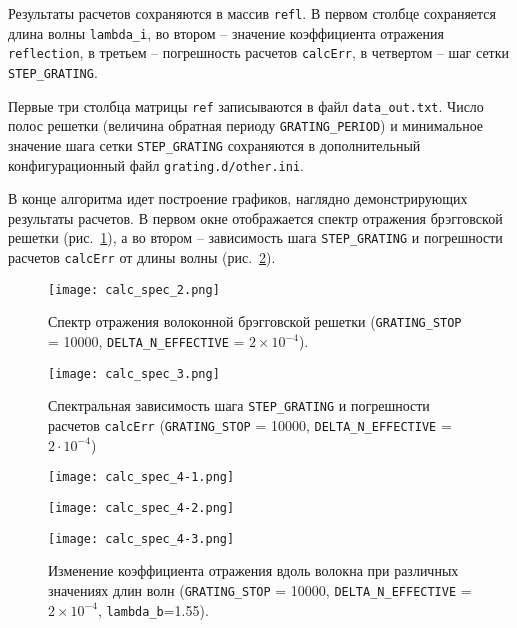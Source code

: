 Результаты расчетов сохраняются в массив \texttt{refl}. В первом столбце сохраняется длина волны \texttt{lambda\_i}, во втором -- значение коэффициента отражения \texttt{reflection}, в третьем -- погрешность расчетов \texttt{calcErr}, в четвертом -- шаг сетки \texttt{STEP\_GRATING}.

Первые три столбца матрицы \texttt{ref} записываются в файл \texttt{data\_out.txt}. Число полос решетки (величина обратная периоду \texttt{GRATING\_PERIOD}) и минимальное значение шага сетки \texttt{STEP\_GRATING} сохраняются в дополнительный конфигурационный файл \texttt{grating.d/other.ini}.

В конце алгоритма идет построение графиков, наглядно демонстрирующих результаты расчетов. В первом окне отображается спектр отражения брэгговской решетки (рис.~\ref{fig:calc_spec_2}), а во втором -- зависимость шага \texttt{STEP\_GRATING} и погрешности расчетов \texttt{calcErr} от длины волны (рис.~\ref{fig:calc_spec_3}).
\begin{figure}
\centering
\texttt{[image: calc\_spec\_2.png]}
\caption{Спектр отражения волоконной брэгговской решетки (\texttt{GRATING\_STOP} = 10000, \texttt{DELTA\_N\_EFFECTIVE} = $2\times {10}^{-4}$).}\label{fig:calc_spec_2}
\end{figure}
\begin{figure}
\centering
\texttt{[image: calc\_spec\_3.png]}
\caption{Спектральная зависимость шага \texttt{STEP\_GRATING} и погрешности расчетов \texttt{calcErr} (\texttt{GRATING\_STOP} = 10000, \texttt{DELTA\_N\_EFFECTIVE} = $2\cdot {10}^{-4}$)}\label{fig:calc_spec_3}
\end{figure}
\newpage
\begin{figure}
\centering
\texttt{[image: calc\_spec\_4-1.png]}
\end{figure}
\begin{figure}
\centering
\texttt{[image: calc\_spec\_4-2.png]}
\end{figure}
\begin{figure}
\centering
\texttt{[image: calc\_spec\_4-3.png]}
\caption{Изменение коэффициента отражения вдоль волокна при различных значениях длин волн (\texttt{GRATING\_STOP} = 10000, \texttt{DELTA\_N\_EFFECTIVE} = $2\times {10}^{-4}$, \texttt{lambda\_b}=1.55).}
\label{fig:calc_spec_4}
\end{figure}
